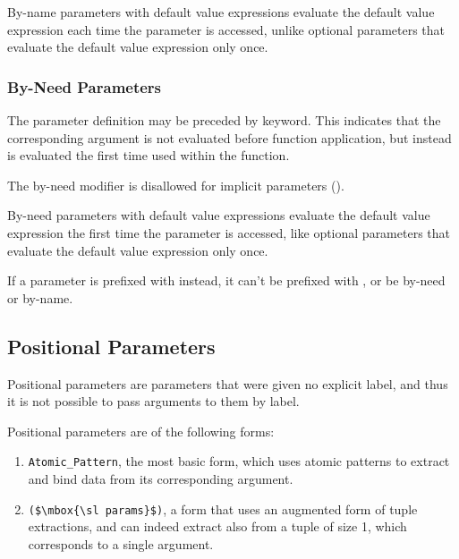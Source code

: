 By-name parameters with default value expressions evaluate the default value expression each time the parameter is accessed, unlike optional parameters that evaluate the default value expression only once. 






\subsubsection{By-Need Parameters}
\label{sec:by-need-parameters}

The parameter definition may be preceded by  keyword. This indicates that the corresponding argument is not evaluated before function application, but instead is evaluated the first time used within the function. 

The by-need modifier is disallowed for implicit parameters ().

By-need parameters with default value expressions evaluate the default value expression the first time the parameter is accessed, like optional parameters that evaluate the default value expression only once. 

If a parameter is prefixed with  instead, it can't be prefixed with , or be by-need or by-name. 





\subsection{Positional Parameters}
\label{sec:positional-parameters}

Positional parameters are parameters that were given no explicit label, and thus it is not possible to pass arguments to them by label. %

Positional parameters are of the following forms:
\begin{enumerate}
  \item \lstinline!Atomic_Pattern!, the most basic form, which uses atomic patterns to extract and bind data from its corresponding argument. 
  \item \lstinline!($\mbox{\sl params}$)!, a form that uses an augmented form of tuple extractions, and can indeed extract also from a tuple of size 1, which corresponds to a single argument. 
\end{enumerate}

